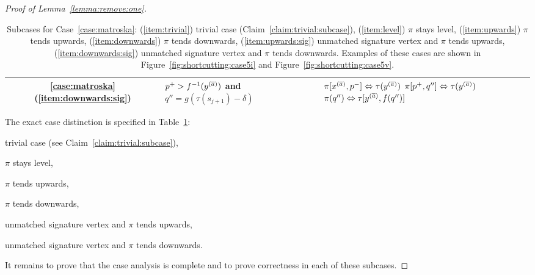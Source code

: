 \documentclass[11pt, letter]{article}
\newcommand{\lemref}[1]{Lemma~\ref{lemma:#1}}
\newcommand{\figref}[1]{Figure~\ref{fig:#1}}
\newcommand{\tablab}[1]{\label{tab:#1}}
\newcommand{\tabref}[1]{Table~\ref{tab:#1}}
\newcommand{\caseref}[1]{Case~\ref{case:#1}}
\newcommand{\claimref}[1]{Claim~\ref{claim:#1}}
\begin{document}
\begin{proof}[Proof of \lemref{remove:one}]
\begin{table}[h]
\begin{tabular}{|c|m{7.5cm}|m{5cm}|}
\\
\hline
\ref{case:matroska}(\ref{item:downwards:sig}) & 
$p^{+} > f^{-1}(y^{(\overline{a})})$ and \newline
$q'' = g(\tau(s_{j+1})-\delta)$
&
$\pi[x^{(\overline{a})},p^{-}] \Leftrightarrow \tau(y^{(\overline{a})})$\newline
$\pi[p^{+},q''] \Leftrightarrow \tau(y^{(\overline{a})})$\newline
$\pi(q'') \Leftrightarrow \tau[y^{(\overline{a})},f(q'')]$\\
\hline
\end{tabular}
\caption{Subcases for \caseref{matroska}:
(\ref{item:trivial}) trivial case (\claimref{trivial:subcase}),
(\ref{item:level}) $\pi$ stays level, 
(\ref{item:upwards}) $\pi$ tends upwards,
(\ref{item:downwards}) $\pi$ tends downwards,
(\ref{item:upwards:sig}) unmatched signature vertex and $\pi$ tends upwards,
(\ref{item:downwards:sig}) unmatched signature vertex and $\pi$ tends downwards.
Examples of these cases are shown in \figref{shortcutting:case5i} and
\figref{shortcutting:case5v}.
}
\tablab{matroska:subcases}
\end{table}


The exact case distinction is specified in \tabref{matroska:subcases}:
\begin{inparaenum}[(i)]
\item trivial case (see \claimref{trivial:subcase}),\label{item:trivial} 
\item $\pi$ stays level, \label{item:level}
\item $\pi$ tends upwards,\label{item:upwards}
\item $\pi$ tends downwards,\label{item:downwards}
\item unmatched signature vertex and $\pi$ tends upwards, \label{item:upwards:sig}
\item unmatched signature vertex and $\pi$ tends downwards. \label{item:downwards:sig}
\end{inparaenum}
It remains to prove that the case analysis is complete and to prove correctness
in each of these subcases.


\end{proof}
\end{document}
